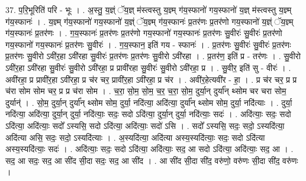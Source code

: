 \documentclass[17pt]{extarticle}
\begin{document}
37. प॒रि॒भूरिति॑ परि - भूः । . अ॒स्तु॒ य॒ज्ञ्ं ॅय॒ज्ञ् म॑स्त्वस्तु य॒ज्ञ्म् ग॑य॒स्फानो॑ गय॒स्फानो॑ य॒ज्ञ् म॑स्त्वस्तु य॒ज्ञ्म् ग॑य॒स्फानः॑ । . य॒ज्ञ्म् ग॑य॒स्फानो॑ गय॒स्फानो॑ य॒ज्ञ्ं ॅय॒ज्ञ्म् ग॑य॒स्फानः॑ प्र॒तर॑णः प्र॒तर॑णो गय॒स्फानो॑ य॒ज्ञ्ं ॅय॒ज्ञ्म् ग॑य॒स्फानः॑ प्र॒तर॑णः । . ग॒य॒स्फानः॑ प्र॒तर॑णः प्र॒तर॑णो गय॒स्फानो॑ गय॒स्फानः॑ प्र॒तर॑णः सु॒वीरः॑ सु॒वीरः॑ प्र॒तर॑णो गय॒स्फानो॑ गय॒स्फानः॑ प्र॒तर॑णः सु॒वीरः॑ । . ग॒य॒स्फान॒ इति॑ गय - स्फानः॑ । . प्र॒तर॑णः सु॒वीरः॑ सु॒वीरः॑ प्र॒तर॑णः प्र॒तर॑णः सु॒वीरो ऽवी॑र॒हा ऽवी॑रहा सु॒वीरः॑ प्र॒तर॑णः प्र॒तर॑णः सु॒वीरो ऽवी॑रहा । . प्र॒तर॑ण॒ इति॑ प्र - तर॑णः । . सु॒वीरो ऽवी॑र॒हा ऽवी॑रहा सु॒वीरः॑ सु॒वीरो ऽवी॑रहा॒ प्र प्रावी॑रहा सु॒वीरः॑ सु॒वीरो ऽवी॑रहा॒ प्र । . सु॒वीर॒ इति॑ सु - वीरः॑ । . अवी॑रहा॒ प्र प्रावी॑र॒हा ऽवी॑रहा॒ प्र च॑र चर॒ प्रावी॑र॒हा ऽवी॑रहा॒ प्र च॑र । . अवी॑र॒हेत्यवी॑र - हा॒ । . प्र च॑र चर॒ प्र प्र च॑रा सोम सोम चर॒ प्र प्र च॑रा सोम । . च॒रा॒ सो॒म॒ सो॒म॒ च॒र॒ च॒रा॒ सो॒म॒ दुर्या॒न् दुर्या᳚न् थ्सोम चर चरा सोम॒ दुर्यान्॑ । . सो॒म॒ दुर्या॒न् दुर्या᳚न् थ्सोम सोम॒ दुर्या॒ नदि॑त्या॒ अदि॑त्या॒ दुर्या᳚न् थ्सोम सोम॒ दुर्या॒ नदि॑त्याः । . दुर्या॒ नदि॑त्या॒ अदि॑त्या॒ दुर्या॒न् दुर्या॒ नदि॑त्याः॒ सदः॒ सदो ऽदि॑त्या॒ दुर्या॒न् दुर्या॒ नदि॑त्याः॒ सदः॑ । . अदि॑त्याः॒ सदः॒ सदो ऽदि॑त्या॒ अदि॑त्याः॒ सदो᳚ ऽस्यसि॒ सदो ऽदि॑त्या॒ अदि॑त्याः॒ सदो॑ ऽसि । . सदो᳚ ऽस्यसि॒ सदः॒ सदो॒ ऽस्यदि॑त्या॒ अदि॑त्या असि॒ सदः॒ सदो॒ ऽस्यदि॑त्याः । . अ॒स्यदि॑त्या॒ अदि॑त्या अस्य॒स्यदि॑त्याः॒ सदः॒ सदो ऽदि॑त्या अस्य॒स्यदि॑त्याः॒ सदः॑ । . अदि॑त्याः॒ सदः॒ सदो ऽदि॑त्या॒ अदि॑त्याः॒ सद॒ आ सदो ऽदि॑त्या॒ अदि॑त्याः॒ सद॒ आ । . सद॒ आ सदः॒ सद॒ आ सी॑द सी॒दा सदः॒ सद॒ आ सी॑द । . आ सी॑द सी॒दा सी॑द॒ वरु॑णो॒ वरु॑णः सी॒दा सी॑द॒ वरु॑णः । \newline
\pagebreak
{}
\end{document}
